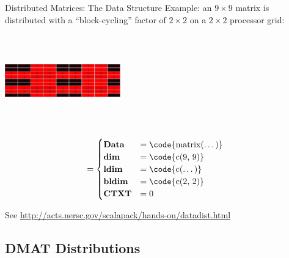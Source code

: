 \begin{frame}
  \begin{block}{Distributed Matrices:  The Data Structure}\pause
      Example:  an $9\times 9$ matrix is distributed with a ``block-cycling'' 
factor of $2\times 2$ on a $2\times 2$ processor grid:
      \begin{center}
      \begin{minipage}{.45\textwidth}
      \includegraphics[width=5cm, height=4cm]{pics/dmat_dist}  
      \end{minipage}\hspace{.1cm}
      \begin{minipage}{.45\textwidth}
      \begin{center}
      \begin{align*}
        &=\begin{cases}
        $\textbf{Data}$ & =\text{\code{matrix(\dots)}}\\
        $\textbf{dim}$ & =\text{\code{c(9, 9)}}\\
        $\textbf{ldim}$ & =\text{\code{c(\dots)}}\\
        $\textbf{bldim}$ & =\text{\code{c(2, 2)}}\\
        $\textbf{CTXT}$ & =0
        \end{cases}
        \end{align*}
      \end{center}
      \end{minipage}
      \end{center}
    {\small See \url{http://acts.nersc.gov/scalapack/hands-on/datadist.html}}
  \end{block}



\subsection{DMAT Distributions}



\end{frame}

